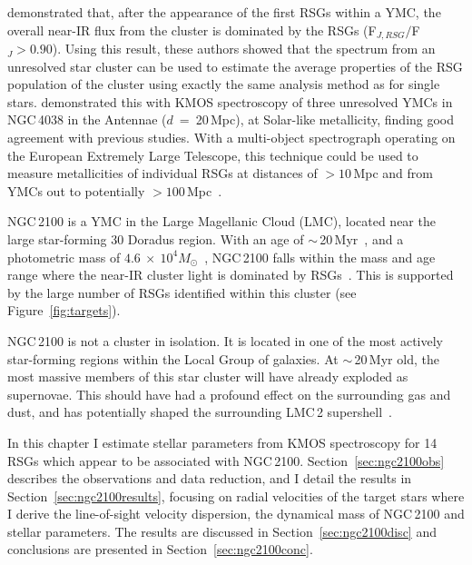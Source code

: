 \citet{2013MNRAS.430L..35G} demonstrated that, after the appearance of the first RSGs within a YMC, the overall near-IR flux from the cluster is dominated by the RSGs (F$_{J, RSG}/$F$_{J}>0.90$).
Using this result, these authors showed that the spectrum from an unresolved star cluster can be used to estimate the average properties of the RSG population of the cluster using exactly the same analysis method as for single stars.
\citet{2015ApJ...812..160L} demonstrated this with KMOS spectroscopy of three unresolved YMCs in NGC\,4038 in the Antennae ($d$~=~20\,Mpc), at Solar-like metallicity, finding good agreement with previous studies.
With a multi-object spectrograph operating on the European Extremely Large Telescope, this technique could be used to measure metallicities of individual RSGs at distances of $>10\,$Mpc and from YMCs out to potentially $>100\,$Mpc~\citep{2011A&A...527A..50E}.

NGC\,2100 is a YMC in the Large Magellanic Cloud (LMC), located near the large star-forming 30 Doradus region.
With an age of $\sim$\,20\,Myr~\citep{1991ApJS...76..185E,2015A&A...575A..62N}, and a photometric mass of $4.6~\times~10^4M_{\odot}$~\citep[assuming~\cite{1966AJ.....71...64K} profiles]{2005ApJS..161..304M}, NGC\,2100 falls within the mass and age range where the near-IR cluster light is dominated by RSGs~\citep{2013MNRAS.430L..35G}.
This is supported by the large number of RSGs identified within this cluster (see Figure~\ref{fig:targets}).

NGC\,2100 is not a cluster in isolation.
It is located in one of the most actively star-forming regions within the Local Group of galaxies.
At $\sim$\,20\,Myr old, the most massive members of this star cluster will have already exploded as supernovae.
This should have had a profound effect on the surrounding gas and dust, and has potentially shaped the surrounding LMC\,2 supershell~\citep[see][]{1999ApJ...518..298P}.

In this chapter I estimate stellar parameters from KMOS spectroscopy for 14 RSGs which appear to be associated with NGC\,2100.
Section~\ref{sec:ngc2100obs} describes the observations and data reduction, and I detail the results in Section~\ref{sec:ngc2100results}, focusing on radial velocities of the target stars where I derive the line-of-sight velocity dispersion,
the dynamical mass of NGC\,2100 and stellar parameters.
The results are discussed in Section~\ref{sec:ngc2100disc} and conclusions are presented in Section~\ref{sec:ngc2100conc}.


